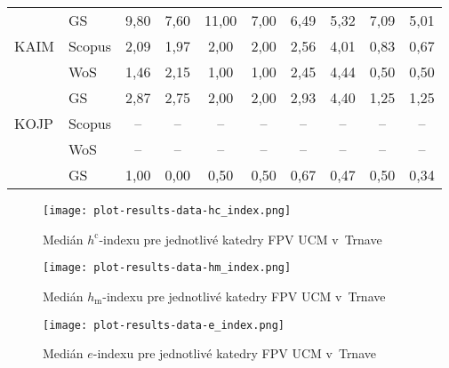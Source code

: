 \begin{table}
\begin{tabularx}{\textwidth}{XXcccc@{\hspace{3ex}}cccc}
         & GS     & 9,80  & 7,60 & 11,00 & 7,00 & 6,49  & 5,32 & 7,09 & 5,01 \\[3ex]
    KAIM & Scopus & 2,09  & 1,97 & 2,00  & 2,00 & 2,56  & 4,01 & 0,83 & 0,67 \\
         & WoS    & 1,46  & 2,15 & 1,00  & 1,00 & 2,45  & 4,44 & 0,50 & 0,50 \\
         & GS     & 2,87  & 2,75 & 2,00  & 2,00 & 2,93  & 4,40 & 1,25 & 1,25 \\[3ex]
    KOJP & Scopus & --    & --   & --    & --   & --    & --   & --   & --   \\
         & WoS    & --    & --   & --    & --   & --    & --   & --   & --   \\
         & GS     & 1,00  & 0,00 & 0,50  & 0,50 & 0,67  & 0,47 & 0,50 & 0,34 \\[0.5ex]
    \bottomrule
  \end{tabularx}
\end{table}

\begin{figure}
  \centering
  \texttt{[image: plot-results-data-hc\_index.png]}
  \caption{Medián $h^\mathrm{c}$-indexu pre jednotlivé katedry FPV UCM v~Trnave}
  \label{fig:hc-index.plot}
\end{figure}

\begin{figure}
  \centering
  \texttt{[image: plot-results-data-hm\_index.png]}
  \caption{Medián $h_\mathrm{m}$-indexu pre jednotlivé katedry FPV UCM v~Trnave}
  \label{fig:hm-index.plot}
\end{figure}

\begin{figure}
  \centering
  \texttt{[image: plot-results-data-e\_index.png]}
  \caption{Medián $e$-indexu pre jednotlivé katedry FPV UCM v~Trnave}
  \label{fig:e-index.plot}
\end{figure}



